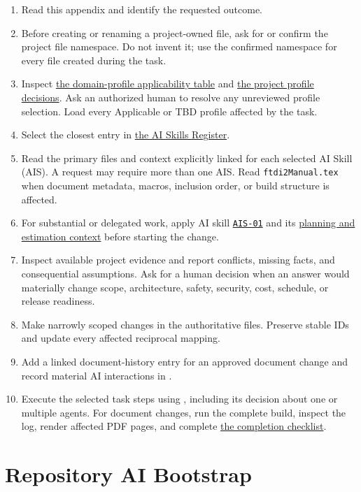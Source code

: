 \begin{enumerate}
\item Read this appendix and identify the requested outcome.
\item Before creating or renaming a project-owned file, ask for or confirm the
project file namespace. Do not invent it; use the confirmed namespace for every
file created during the task.
\item Inspect \hyperref[Table:ProjectDomainProfiles]{the domain-profile
applicability table} and \hyperref[Table:ProjectDomainProfiles]{the project
profile decisions}. Ask an authorized human to resolve any unreviewed profile
selection. Load every Applicable or TBD profile affected by the task.
\item Select the closest entry in
\hyperref[Table:AISkills]{the AI Skills Register}.
\item Read the primary files and context explicitly linked for each selected
AI Skill (AIS). A request may require more than one AIS. Read
\texttt{ftdi2Manual.tex} when document metadata, macros, inclusion order, or
build structure is affected.
\item For substantial or delegated work, apply AI skill \hyperref[Skill:AIS-01]{\texttt{AIS-01}}
and its \hyperref[Section:AIPlanningEstimateContext]{planning and estimation
context} before starting the change.
\item Inspect available project evidence and report conflicts, missing facts,
and consequential assumptions. Ask for a human decision when an answer would
materially change scope, architecture, safety, security, cost, schedule, or
release readiness.
\item Make narrowly scoped changes in the authoritative files. Preserve stable
IDs and update every affected reciprocal mapping.
\item Add a linked document-history entry for an approved document change and
record material AI interactions in .
\item Execute the selected task steps using
, including its decision about one or
multiple agents. For document changes, run the complete build, inspect the log,
render affected PDF pages, and
complete \hyperref[Table:AICompletionChecklist]{the completion checklist}.
\end{enumerate}

\section{Repository AI Bootstrap}
\label{Section:AIRepositoryBootstrap}

